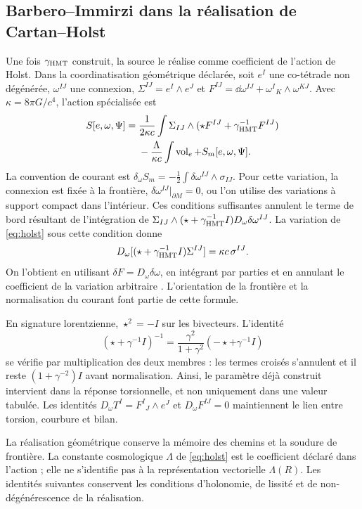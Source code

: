 \subsection{Barbero--Immirzi dans la réalisation de Cartan--Holst}
Une fois $\gamma_{\mathrm{HMT}}$ construit, la source le réalise comme
coefficient de l’action de Holst. Dans la coordinatisation géométrique déclarée,
soit $e^I$ une co-tétrade non dégénérée, $\omega^{IJ}$ une connexion,
$\Sigma^{IJ}=e^I\wedge e^J$ et
$F^{IJ}=\dd\omega^{IJ}+\omega^I{}_K\wedge\omega^{KJ}$.
Avec $\kappa=8\pi G/c^4$, l’action spécialisée est
\begin{equation}
\begin{aligned}
S[e,\omega,\Psi]
={}&\frac1{2\kappa c}\int
\Sigma_{IJ}\wedge(\star F^{IJ}+\gamma_{\mathrm{HMT}}^{-1}F^{IJ})\\
&-\frac{\Lambda}{\kappa c}\int\operatorname{vol}_e
+S_m[e,\omega,\Psi].
\end{aligned}
\label{eq:holst}
\end{equation}
La convention de courant est
$\delta_\omega S_m=-\tfrac12\int\delta\omega^{IJ}\wedge\sigma_{IJ}$.
Pour cette variation, la connexion est fixée à la frontière,
$\delta\omega^{IJ}|_{\partial M}=0$, ou l'on utilise des variations à
support compact dans l'intérieur. Ces conditions suffisantes annulent
le terme de bord résultant de l'intégration de
$\Sigma_{IJ}\wedge(\star+\gamma_{\mathrm{HMT}}^{-1}I)
D_\omega\delta\omega^{IJ}$.
La variation de \eqref{eq:holst} sous cette condition donne
\[
D_\omega[(\star+\gamma_{\mathrm{HMT}}^{-1}I)\Sigma^{IJ}]
=\kappa c\,\sigma^{IJ}.
\]
On l'obtient en utilisant $\delta F=D_\omega\delta\omega$, en intégrant par parties
et en annulant le coefficient de la variation arbitraire
\cite{holst}. L'orientation de la frontière et la normalisation
du courant font partie de cette formule.

En signature lorentzienne, $\star^2=-I$ sur les bivecteurs. L'identité
\[
(\star+\gamma^{-1}I)^{-1}
=\frac{\gamma^2}{1+\gamma^2}(-\star+\gamma^{-1}I)
\]
se vérifie par multiplication des deux membres : les termes croisés
s'annulent et il reste $(1+\gamma^{-2})I$ avant normalisation.
Ainsi, le paramètre déjà construit intervient dans la réponse torsionnelle,
et non uniquement dans une valeur tabulée.
Les identités
$D_\omega T^I=F^I{}_J\wedge e^J$ et $D_\omega F^{IJ}=0$
maintiennent le lien entre torsion, courbure et bilan.

La réalisation géométrique conserve la mémoire des chemins et la
soudure de frontière. La constante cosmologique \(\Lambda\) de
\eqref{eq:holst} est le coefficient déclaré dans l’action ; elle ne
s’identifie pas à la représentation vectorielle \(\Lambda(R)\).
Les identités suivantes conservent les conditions d’holonomie,
de lissité et de non-dégénérescence de la réalisation.




